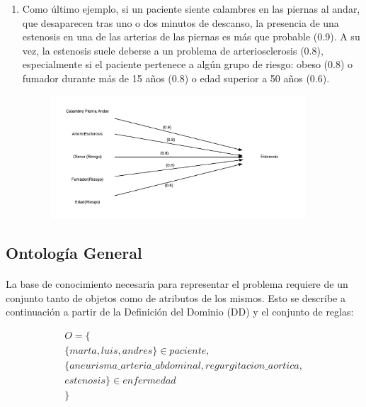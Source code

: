\documentclass[10pt, a4paper,spanish]{article}
\begin{document}
\begin{enumerate}
			\item Como último ejemplo, si un paciente siente calambres en las piernas al andar, que desaparecen tras uno o dos minutos de descanso, la presencia de una estenosis en una de las arterias de las piernas es más que probable (0.9). A su vez, la estenosis suele deberse a un problema de arteriosclerosis (0.8), especialmente si el paciente pertenece a algún grupo de riesgo: obeso (0.8) o fumador durante más de 15 años (0.8) o edad superior a 50 años (0.6).
			\begin{figure}[H]
				\begin{center}
					\includegraphics[width=0.9\textwidth]{paragraph-3}
				\end{center}
			\end{figure}

		\end{enumerate}

		\subsection{Ontología General}

			\paragraph{}
			La base de conocimiento necesaria para representar el problema requiere de un conjunto tanto de objetos como de atributos de los mismos. Esto se describe a continuación a partir de la Definición del Dominio (DD) y el conjunto de reglas:

			\begin{multline*}
				O = \{ \\
					\{marta, luis, andres\} \in paciente, \\
					\{aneurisma\_arteria\_abdominal, regurgitacion\_aortica, \\
					estenosis\} \in enfermedad \\
				\}
			\end{multline*}
\end{document}
